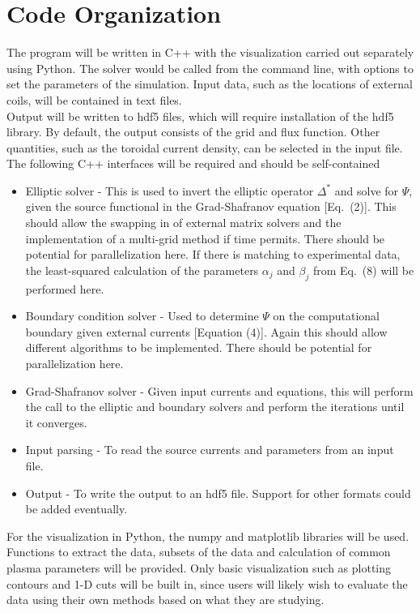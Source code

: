 \documentclass[paper=letter, fontsize=11pt]{scrartcl} %
\begin{document}
\section{Code Organization}

The program will be written in C++ with the visualization carried out separately using Python. The solver would be called from the command line, with options to set the parameters of the simulation. Input data, such as the locations of external coils, will be contained in text files. 
\\

Output will be written to hdf5 files, which will require installation of the hdf5 library.  By default, the output consists of the grid and flux function.  Other quantities, such as the toroidal current density, can be selected in the input file.\\

The following C++ interfaces will be required and should be self-contained
\begin{itemize}
\item Elliptic solver - This is used to invert the elliptic operator $\Delta^*$ and solve for $\Psi$, given the source functional in the Grad-Shafranov equation [Eq.~(2)]. This should allow the swapping in of external matrix solvers and the implementation of a multi-grid method if time permits. There should be potential for parallelization here. If there is matching to experimental data, the least-squared calculation of the parameters $\alpha_j$ and $\beta_j$ from Eq.~(8) will be performed here. 
\item Boundary condition solver - Used to determine $\Psi$ on the computational boundary given external currents [Equation (4)]. Again this should allow different algorithms to be implemented. There should be potential for parallelization here. 
\item Grad-Shafranov solver - Given input currents and equations, this will perform the call to the elliptic and boundary solvers and perform the iterations until it converges.
\item Input parsing - To read the source currents and parameters from an input file.
\item Output - To write the output to an hdf5 file. Support for other formats could be added eventually.
\end{itemize}

For the visualization in Python, the numpy and matplotlib libraries will be used. Functions to extract the data, subsets of the data and calculation of common plasma parameters will be provided. Only basic visualization such as plotting contours and 1-D cuts will be built in, since users will likely wish to evaluate the data using their own methods based on what they are studying. \\
\end{document}

